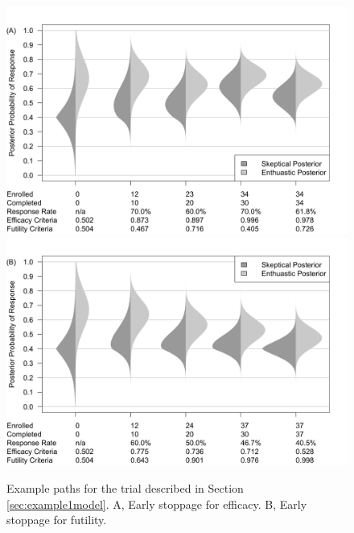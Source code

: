 \documentclass[12pt]{article}
\begin{document}
%

\begin{figure}[htbp]
\begin{center}
    \includegraphics[width=6in]{./figures/figure2a.png}
    \includegraphics[width=6in]{./figures/figure2b.png}
    \caption{Example paths for the trial described in Section \ref{sec:example1model}. A, Early stoppage for efficacy. B, Early stoppage for futility.}
	\label{fig:figure2}
\end{center}
\end{figure}
\end{document}
